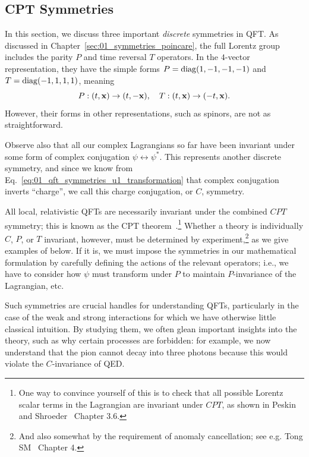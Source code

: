\subsection{CPT Symmetries}
\label{sec:01_qft_spinors_cpt}

In this section, we discuss three important \textit{discrete} symmetries in QFT.
As discussed in Chapter~\ref{sec:01_symmetries_poincare}, the full Lorentz group includes the parity $P$ and time reversal $T$ operators.
In the $4$-vector representation, they have the simple forms $P = \mathrm{diag}(1, -1, -1, -1)$ and $T = \mathrm{diag}(-1, 1, 1, 1)$, meaning
\begin{equation}
	\label{eq:01_qft_spinors_pt4v}
	P: (t, \mathbf{x}) \rightarrow (t, -\mathbf{x}), \quad T: (t, \mathbf{x}) \rightarrow (-t, \mathbf{x}).
\end{equation}
However, their forms in other representations, such as spinors, are not as straightforward.

Observe also that all our complex Lagrangians so far have been invariant under some form of complex conjugation $\psi \leftrightarrow \psi^*$.
This represents another discrete symmetry, and since we know from Eq.~\ref{eq:01_qft_symmetries_u1_transformation} that complex conjugation inverts ``charge'', we call this charge conjugation, or $C$, symmetry.

All local, relativistic QFTs are necessarily invariant under the combined $CPT$ symmetry; this is known as the CPT theorem~\cite{Schwinger:1951xk, Luders:1954zz}.\footnote{One way to convince yourself of this is to check that all possible Lorentz scalar terms in the Lagrangian are invariant under $CPT$, as shown in Peskin and Shroeder~\cite{Peskin:1995ev} Chapter 3.6.}
Whether a theory is individually $C$, $P$, or $T$ invariant, however, must be determined by experiment,\footnote{And also somewhat by the requirement of anomaly cancellation; see e.g. Tong SM~\cite{TongSM} Chapter 4.} as we give examples of below.
If it is, we must impose the symmetries in our mathematical formulation by carefully defining the actions of the relevant operators; i.e., we have to consider how $\psi$ must transform under $P$ to maintain $P$-invariance of the Lagrangian, etc.

Such symmetries are crucial handles for understanding QFTs, particularly in the case of the weak and strong interactions for which we have otherwise little classical intuition.
By studying them, we often glean important insights into the theory, such as why certain processes are forbidden: for example, we now understand that the pion cannot decay into three photons because this would violate the $C$-invariance of QED.

